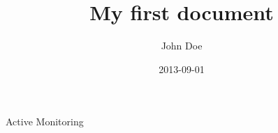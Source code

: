 \documentclass{article}
\title{My first document}
\date{2013-09-01}
\author{John Doe}
\begin{document}
  Active Monitoring
\end{document}
